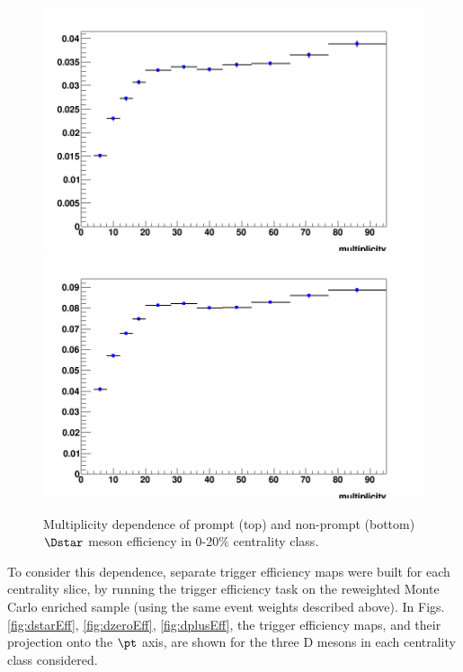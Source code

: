 \begin{figure}[!htp]
	\centering
    \includegraphics[width=.7\linewidth]{figuresVsCent/Global/EfficiencyMap_1D_DStar_c_020_ZNA_vsMult_wLimAcc_Plot.png}
    \includegraphics[width=.7\linewidth]{figuresVsCent/Global/EfficiencyMap_1D_DStar_b_020_ZNA_vsMult_wLimAcc_Plot.png}
\caption{Multiplicity dependence of prompt (top) and non-prompt (bottom) $\Dstar$ meson efficiency in 0-20$\%$ centrality class.}
	\label{fig:dEffvsMult}	
\end{figure}

To consider this dependence, separate trigger efficiency maps were built for each centrality slice, by running the trigger efficiency task on the reweighted Monte Carlo enriched sample (using the same event weights described above).
In Figs. \ref{fig:dstarEff}, \ref{fig:dzeroEff}, \ref{fig:dplusEff}, the trigger efficiency maps, and their projection onto the $\pt$ axis, are shown for the three D mesons in each centrality class considered.

